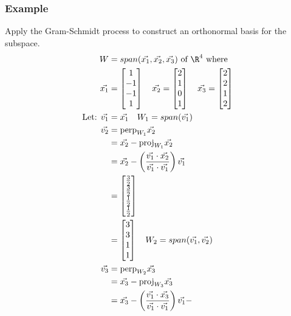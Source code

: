 \documentclass{math}
\begin{document}
\subsubsection*{Example}
Apply the Gram-Schmidt process to construct an orthonormal basis for the
subspace.
\begin{align*}
  W &= span(\vec{x_1},\vec{x_2},\vec{x_3}) \text{ of } \R^4 \text{ where } \\
  \vec{x_1} &= \begin{bmatrix}1 \\ -1 \\ -1 \\ 1\end{bmatrix} \quad
    \vec{x_2} = \begin{bmatrix}2 \\ 1 \\ 0 \\ 1\end{bmatrix} \quad
    \vec{x_3} = \begin{bmatrix}2 \\ 2 \\ 1 \\ 2\end{bmatrix} \\
  \text{Let: } \vec{v_1} &= \vec{x_1} \quad W_1 = span(\vec{v_1}) \\
  \vec{v_2} &= \text{perp}_{W_1}\vec{x_2} \\
  &= \vec{x_2}-\text{proj}_{W_1}\vec{x_2} \\
  &= \vec{x_2}-\left(\frac{\vec{v_1}\cdot\vec{x_2}}
    {\vec{v_1}\cdot\vec{v_1}}\right)\vec{v_1} \\
  &= \begin{bmatrix}
    \frac{3}{2} \\ \frac{3}{2} \\ \frac{1}{2} \\ \frac{1}{2}
  \end{bmatrix} \\
  &= \begin{bmatrix}3 \\ 3 \\ 1 \\ 1\end{bmatrix} \quad
    W_2 = span(\vec{v_1},\vec{v_2}) \\
  \vec{v_3} &= \text{perp}_{W_2}\vec{x_3} \\
  &= \vec{x_3}-\text{proj}_{W_3}\vec{x_3} \\
  &= \vec{x_3}-\left(\frac{\vec{v_1}\cdot\vec{x_3}}
    {\vec{v_1}\cdot\vec{v_1}}\right)\vec{v_1}-

\end{align*}
\end{document}

